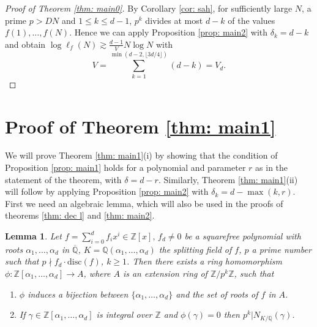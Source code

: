 \documentclass[alphabetic]{amsart}
\newtheorem{lem}[claim]{Lemma}
\theoremstyle{definition}
\numberwithin{equation}{section}
\newcommand{\Z}{{\mathbb Z}}
\newcommand{\Q}{{\mathbb Q}}
\newcommand{\Qb}{{\overline{\Q}}}
\newcommand{\disc}{{\mathrm{disc}}}
\numberwithin{equation}{section}
\begin{document}
\begin{proof}[Proof of Theorem \ref{thm: main0}] By Corollary \ref{cor: sah}, for sufficiently large $N$, a prime $p>DN$ and $1\le k\le d-1$, $p^k$ divides at most $d-k$ of the values $f(1),\ldots,f(N)$.
Hence we can apply Proposition \ref{prop: main2} with $\delta_k=d-k$ and obtain 
$\log \ell_f(N)\gtrsim \frac{d-1}VN\log N$ with $$V=\sum_{k=1}^{\min(d-2,\lfloor 3d/4\rfloor)}(d-k)=V_d.$$
\end{proof}

\section{Proof of Theorem \ref{thm: main1}}

We will prove Theorem \ref{thm: main1}(i) by showing that the condition of Proposition \ref{prop: main1} holds for a polynomial and parameter $r$ as in the statement of the theorem, with $\delta=d-r$. Similarly, Theorem \ref{thm: main1}(ii) will follow by applying Proposition \ref{prop: main2} with $\delta_k=d-\max(k,r)$. First we need an algebraic lemma, which will also be used in the proofs of theorems \ref{thm: dec l} and \ref{thm: main2}.



\begin{lem}\label{lem: hom} Let $f=\sum_{i=0}^df_ix^i\in\Z[x],\,f_d\neq 0$ be a squarefree polynomial with roots $\alpha_1,\ldots,\alpha_d$ in $\Qb$, $K=\Q(\alpha_1,\ldots,\alpha_d)$ the splitting field of $f$, $p$ a prime number such that $p\nmid f_d\cdot\disc(f)$, $k\ge 1$. Then there exists a ring homomorphism $\phi:\Z[\alpha_1,\ldots,\alpha_d]\to A$, where $A$ is an extension ring of $\Z/p^k\Z$, such that 
\begin{enumerate}
    \item[(i)] $\phi$ induces a bijection between $\{\alpha_1,\ldots,\alpha_d\}$ and the set of roots of $f$ in $A$.
    \item[(ii)] If $\gamma\in\Z[\alpha_1,\ldots,\alpha_d]$ is integral over $\Z$ and $\phi(\gamma)=0$ then $p^k|N_{K/\Q}(\gamma)$.
\end{enumerate}
\end{lem}
\end{document}
